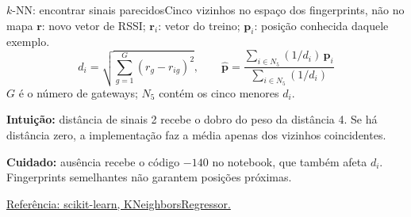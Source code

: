 \documentclass[aspectratio=169,10pt]{beamer}
\begin{document}
\begin{frame}{$k$-NN: encontrar sinais parecidos}{Cinco vizinhos no espaço dos fingerprints, não no mapa}
\small
\setlength{\abovedisplayskip}{4pt}\setlength{\belowdisplayskip}{4pt}
$\mathbf r$: novo vetor de RSSI; $\mathbf r_i$: vetor do treino;
$\mathbf p_i$: posição conhecida daquele exemplo.
\[
d_i=\sqrt{\sum_{g=1}^{G}(r_g-r_{ig})^2},
\qquad
\widehat{\mathbf p}=
\frac{\sum_{i\in N_5}(1/d_i)\,\mathbf p_i}{\sum_{i\in N_5}(1/d_i)}
\]
$G$ é o número de gateways; $N_5$ contém os cinco menores $d_i$.
\par\vspace{3mm}
\centering
{}
\par\vspace{1mm}\raggedright
\textbf{Intuição:} distância de sinais 2 recebe o dobro do peso da distância 4.
Se há distância zero, a implementação faz a média apenas dos vizinhos coincidentes.
\par\vspace{2mm}
\textbf{Cuidado:} ausência recebe o código $-140$ no notebook, que também afeta $d_i$.
Fingerprints semelhantes não garantem posições próximas.
\par\scriptsize \href{https://scikit-learn.org/stable/modules/generated/sklearn.neighbors.KNeighborsRegressor.html}{Referência: scikit-learn, KNeighborsRegressor.}
\end{frame}
\end{document}
